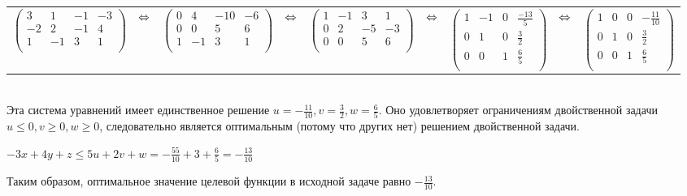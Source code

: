 \documentclass{article}
\begin{document}
	\begin{tabular}{ccccccccc}
		$\left(\begin{array}{ccc|c}
		3 	& 1 	& -1 	& -3	\\
		-2	& 2		& -1 	& 4	\\
		1	& -1	& 3 	& 1	\\
		\end{array}\right)$
		& $\hfill \Leftrightarrow \hfill$ &
		$\left(\begin{array}{ccc|c}
		0 	& 4 	& -10 	& -6	\\
		0	& 0		& 5 	& 6	\\
		1	& -1	& 3 	& 1	\\
		\end{array}\right)$
		& $\hfill \Leftrightarrow \hfill$ & 
		$\left(\begin{array}{ccc|c}
		1	& -1	& 3 	& 1	\\
		0 	& 2 	& -5 	& -3	\\
		0	& 0		& 5 	& 6	\\
		\end{array}\right)$
		& $\hfill \Leftrightarrow \hfill$ & 
		$\left(\begin{array}{ccc|c}
		1	& -1	& 0 	& \frac{-13}{5}	\\
		0 	& 1 	& 0 	& \frac{3}{2}	\\
		0	& 0		& 1 	& \frac{6}{5}	\\
		\end{array}\right)$
		& $\hfill \Leftrightarrow \hfill$ & 
		$\left(\begin{array}{ccc|c}
		1	& 0 	& 0 	& -\frac{11}{10}	\\
		0 	& 1 	& 0 	& \frac{3}{2}	\\
		0	& 0		& 1 	& \frac{6}{5}	\\
		\end{array}\right)$
	\end{tabular}\\
	\fontsize{12}{12}
	Эта система уравнений имеет единственное решение $u = -\frac{11}{10}, v = \frac{3}{2}, w = \frac{6}{5}$. Оно удовлетворяет ограничениям двойственной задачи $u \leq 0 ,	v \geq 0,	w \geq 0$, следовательно является оптимальным (потому что других нет) решением двойственной задачи. 
	\begin{center}
		$-3x+4y+z \leq 5u+2v+w = -\frac{55}{10} + 3 + \frac{6}{5} = -\frac{13}{10}$
	\end{center}
	Таким образом, оптимальное значение целевой функции в исходной задаче равно  $-\frac{13}{10}$.


	
\end{document}

